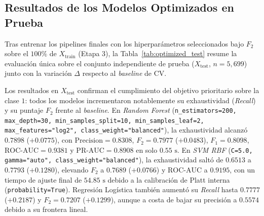 \documentclass[conference]{IEEEtran}
\begin{document}
\subsection{Resultados de los Modelos Optimizados en Prueba}

Tras entrenar los pipelines finales con los hiperparámetros seleccionados bajo $F_2$ sobre el $100\%$ de $X_{\text{train}}$ (Etapa 3), la Tabla~\ref{tab:optimized_test} resume la evaluación única sobre el conjunto independiente de prueba ($X_{\text{test}}$, $n=5{,}699$) junto con la variación $\Delta$ respecto al \textit{baseline} de CV.

\begin{table}[t]
\centering
\scriptsize
\setlength{\tabcolsep}{3pt}
\caption{Resultados Finales en Conjunto Independiente de Prueba ($X_{\text{test}}$, $n=5{,}699$) de Modelos Optimizados por $F_2$-Score}
\label{tab:optimized_test}
\end{table}

Los resultados en $X_{\text{test}}$ confirman el cumplimiento del objetivo prioritario sobre la clase $1$: todos los modelos incrementaron notablemente su exhaustividad (\textit{Recall}) y su puntaje $F_2$ frente al \textit{baseline}. En \textit{Random Forest} (\texttt{n\_estimators=200, max\_depth=30, min\_samples\_split=10, min\_samples\_leaf=2, max\_features="log2", class\_weight="balanced"}), la exhaustividad alcanzó $0.7898$ ($+0.0775$), con $\text{Precision}=0.8308$, $F_2=0.7977$ ($+0.0483$), $F_1=0.8098$, $\text{ROC-AUC}=0.9381$ y $\text{PR-AUC}=0.8908$ en solo $0.55\text{ s}$. En \textit{SVM RBF} (\texttt{C=5.0, gamma="auto", class\_weight="balanced"}), la exhaustividad saltó de $0.6513$ a $0.7793$ ($+0.1280$), elevando $F_2$ a $0.7689$ ($+0.0766$) y $\text{ROC-AUC}$ a $0.9195$, con un tiempo de ajuste final de $54.85\text{ s}$ debido a la calibración de Platt interna (\texttt{probability=True}). Regresión Logística también aumentó su \textit{Recall} hasta $0.7777$ ($+0.2187$) y $F_2=0.7207$ ($+0.1299$), aunque a costa de bajar su precisión a $0.5574$ debido a su frontera lineal.
\end{document}
